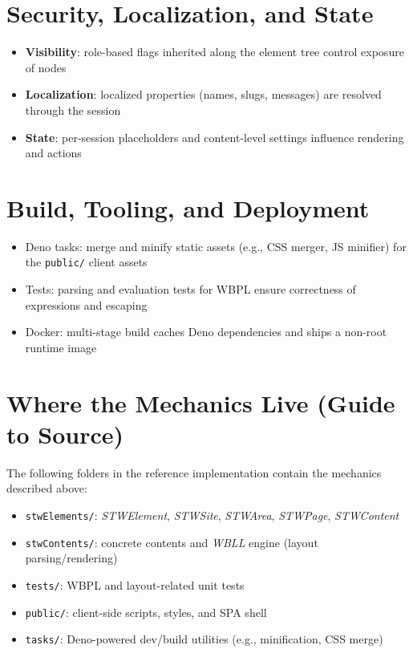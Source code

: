 \section{Security, Localization, and State}
\begin{itemize}
	\item \textbf{Visibility}: role-based flags inherited along the element tree control exposure of nodes
	\item \textbf{Localization}: localized properties (names, slugs, messages) are resolved through the session
	\item \textbf{State}: per-session placeholders and content-level settings influence rendering and actions
\end{itemize}

\section{Build, Tooling, and Deployment}
\begin{itemize}
	\item Deno tasks: merge and minify static assets (e.g., CSS merger, JS minifier) for the \texttt{public/} client assets
	\item Tests: parsing and evaluation tests for WBPL ensure correctness of expressions and escaping
	\item Docker: multi-stage build caches Deno dependencies and ships a non-root runtime image
\end{itemize}

\section{Where the Mechanics Live (Guide to Source)}
The following folders in the reference implementation contain the mechanics described above:
\begin{itemize}
	\item \texttt{stwElements/}: \textit{STWElement}, \textit{STWSite}, \textit{STWArea}, \textit{STWPage}, \textit{STWContent}
	\item \texttt{stwContents/}: concrete contents and \textit{WBLL} engine (layout parsing/rendering)
	\item \texttt{tests/}: WBPL and layout-related unit tests
	\item \texttt{public/}: client-side scripts, styles, and SPA shell
	\item \texttt{tasks/}: Deno-powered dev/build utilities (e.g., minification, CSS merge)
\end{itemize}

